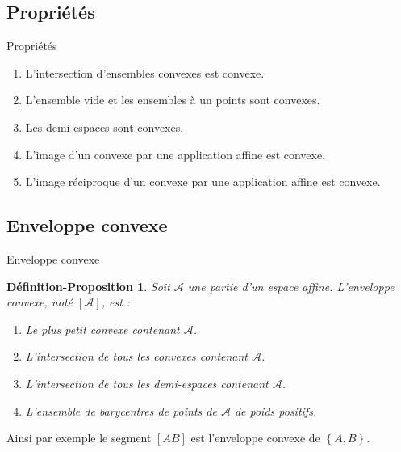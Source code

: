 \documentclass[aspectratio=1610 %
]{beamer}
\newtheorem{defprop}[theorem]{Définition-Proposition}
\begin{document}
\subsection{Propriétés}
\begin{frame}{Propriétés}
  \begin{enumerate}[<+(1)->]
    \item L'intersection d'ensembles convexes est convexe.
    \item L'ensemble vide et les ensembles à un points sont convexes.
    \item Les demi-espaces sont convexes.
    \item L'image d'un convexe par une application affine est convexe.
    \item L'image réciproque d'un convexe par une application affine est convexe.
  \end{enumerate}
\end{frame}

\subsection{Enveloppe convexe}
\begin{frame}{Enveloppe convexe}
  \begin{defprop}
    Soit $\mathcal{A}$ une partie d'un espace affine. L'enveloppe convexe, noté $[\mathcal{A}]$, est :
    \begin{enumerate}[<+(1)->]
     \item Le plus petit convexe contenant $\mathcal{A}$.
     \item L'intersection de tous les convexes contenant $\mathcal{A}$.
     \item L'intersection de tous les demi-espaces contenant $\mathcal{A}$.
     \item L'ensemble de barycentres de points de $\mathcal{A}$ de poids positifs.
    \end{enumerate}
  \end{defprop}\pause
    Ainsi par exemple le segment $[AB]$ est l'enveloppe convexe de $\left\{A,B\right\}$.
\end{frame}
\end{document}
